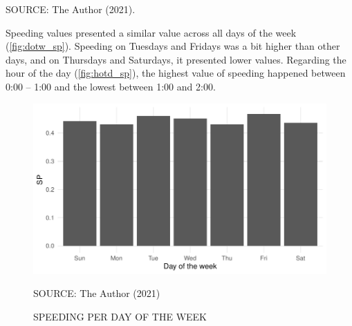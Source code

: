 \begin{table}[!htbp]
    \label{tab:speeding}
    \par \vspace{2mm} \footnotesize \raggedright
    SOURCE: The Author (2021).
\end{table}


Speeding values presented a similar value across all days of the week (\autoref{fig:dotw_sp}). Speeding on Tuesdays and Fridays was a bit higher than other days, and on Thursdays and Saturdays, it presented lower values. Regarding the hour of the day (\autoref{fig:hotd_sp}), the highest value of speeding happened between 0:00 – 1:00 and the lowest between 1:00 and 2:00. 

\begin{figure}[!htbp]
    \centering\footnotesize
    \captionsetup{font=footnotesize}
    \caption{SPEEDING PER DAY OF THE WEEK}
    \includegraphics{fig/dotw_sp.pdf}
    \label{fig:dotw_sp}
    \par SOURCE: The Author (2021)
\end{figure}


